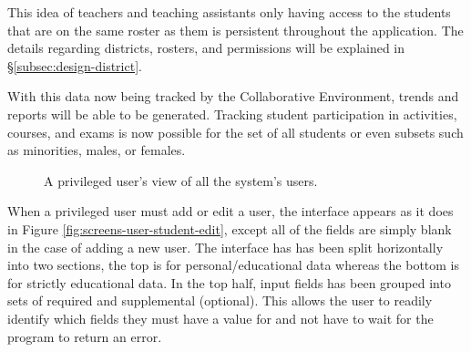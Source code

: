 This idea of teachers and teaching assistants only having access to the students that are on the same roster as them is persistent throughout the application. The details regarding districts, rosters, and permissions will be explained in \S \ref{subsec:design-district}.

With this data now being tracked by the Collaborative Environment, trends and reports will be able to be generated. Tracking student participation in activities, courses, and exams is now possible for the set of all students or even subsets such as minorities, males, or females.

\begin{figure}[h!]
	\centering
	\caption{A privileged user's view of all the system's users.}
	\label{fig:screens-user-list}
\end{figure}

When a privileged user must add or edit a user, the interface appears as it does in Figure \ref{fig:screens-user-student-edit}, except all of the fields are simply blank in the case of adding a new user. The interface has has been split horizontally into two sections, the top is for personal/educational data whereas the bottom is for strictly educational data. In the top half, input fields has been grouped into sets of required and supplemental (optional). This allows the user to readily identify which fields they must have a value for and not have to wait for the program to return an error.

